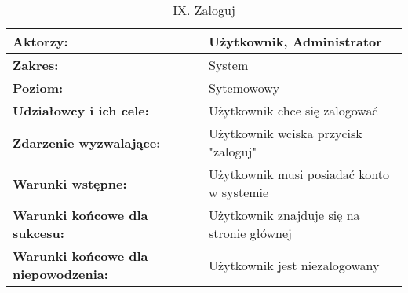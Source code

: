	\begin{table}[H]
\centering
\caption{IX. Zaloguj}
\label{Zaloguj}
\begin{tabular}{|p{7cm}|p{7cm}|}
  \hline 
  \textbf{Aktorzy:} & Użytkownik, Administrator\\
  \hline
  \textbf{Zakres:} & System \\
	\hline
  \textbf{Poziom:} & Sytemowowy \\
	\hline
  \textbf{Udziałowcy i ich cele: } & Użytkownik chce się zalogować
 \\
	\hline
  \textbf{Zdarzenie wyzwalające: } & Użytkownik wciska przycisk "zaloguj"\\
	\hline
  \textbf{Warunki wstępne: } & Użytkownik musi posiadać konto w systemie \\
	\hline
  \textbf{Warunki końcowe dla sukcesu:} & Użytkownik znajduje się na stronie głównej\\
	\hline
  \textbf{Warunki końcowe dla niepowodzenia:} & Użytkownik jest niezalogowany \\
  \hline
\end{tabular} 
\end{table}

